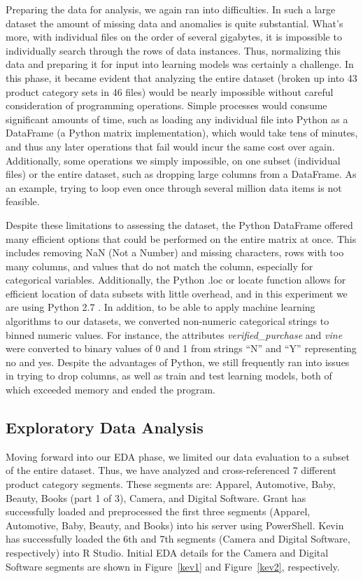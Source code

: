 \documentclass[10pt, conference, compsocconf]{IEEEtran}
\begin{document}
Preparing the data for analysis, we again ran into difficulties. In such a large dataset the amount of missing data and anomalies is quite substantial. What's more, with individual files on the order of several gigabytes, it is impossible to individually search through the rows of data instances. Thus, normalizing this data and preparing it for input into learning models was certainly a challenge. In this phase, it became evident that analyzing the entire dataset (broken up into 43 product category sets in 46 files) would be nearly impossible without careful consideration of programming operations. Simple processes would consume significant amounts of time, such as loading any individual file into Python \cite{python} as a DataFrame (a Python matrix implementation), which would take tens of minutes, and thus any later operations that fail would incur the same cost over again.  Additionally, some operations we simply impossible, on one subset (individual files) or the entire dataset, such as dropping large columns from a DataFrame. As an example, trying to loop even once through several million data items is not feasible. 

Despite these limitations to assessing the dataset, the Python DataFrame offered many efficient options that could be performed on the entire matrix at once. This includes removing NaN (Not a Number) and missing characters, rows with too many columns, and values that do not match the column, especially for categorical variables. Additionally, the Python .loc or locate function allows for efficient location of data subsets with little overhead, and in this experiment we are using Python 2.7 \cite{python}. In addition, to be able to apply machine learning algorithms to our datasets, we converted non-numeric categorical strings to binned numeric values. For instance, the attributes \textit{verified\_purchase} and \textit{vine} were converted to binary values of 0 and 1 from strings “N” and “Y” representing no and yes. Despite the advantages of Python, we still frequently ran into issues in trying to drop columns, as well as train and test learning models, both of which exceeded memory and ended the program.

\subsection{Exploratory Data Analysis}\label{eda} 

Moving forward into our EDA phase, we limited our data evaluation to a subset of the entire dataset. Thus, we have analyzed and cross-referenced 7 different product category segments. These segments are: Apparel, Automotive, Baby, Beauty, Books (part 1 of 3), Camera, and Digital Software. Grant has successfully loaded and preprocessed the first three segments (Apparel, Automotive, Baby, Beauty, and Books) into his server using PowerShell. Kevin has successfully loaded the 6th and 7th segments (Camera and Digital Software, respectively) into R Studio. Initial EDA details for the Camera and Digital Software segments are shown in Figure~\ref{kev1} and Figure~\ref{kev2}, respectively. 
\end{document}
